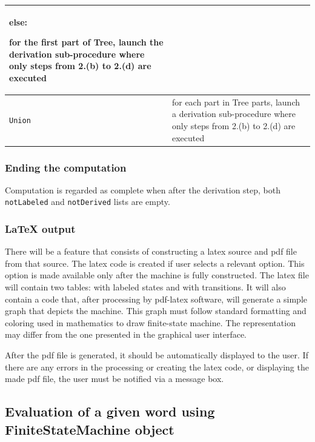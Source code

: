 \documentclass{article}
\begin{document}
\begin{tabularx}{\textwidth}{l|X}
\vspace{5pt}
\textbf{else}:

for the first part of Tree, launch the derivation sub-procedure where only steps from 2.(b) to 2.(d)
are executed \\ \hline

\verb|Union| &

for each part in Tree parts, launch a derivation sub-procedure where only steps from 2.(b) to 2.(d)
are executed \\

\end{tabularx}

\newpage

\subsubsection{Ending the computation}

Computation is regarded as complete when after the derivation step, both \verb|notLabeled| and
\verb|notDerived| lists are empty.

\subsubsection*{LaTeX output}

There will be a feature that consists of constructing a latex source and pdf file from that source.
The latex code is created if user selects a relevant option. This option is made available only
after the machine is fully constructed. The latex file will contain two tables: with labeled states
and with transitions. It will also contain a code that, after processing by pdf-latex software, will
generate a simple graph that depicts the machine. This graph must follow standard
formatting and coloring used in mathematics to draw finite-state machine. The representation may
differ from the one presented in the graphical user interface.

After the pdf file is generated, it should be automatically displayed to the user. If there are any
errors in the processing or creating the latex code, or displaying the made pdf file, the user must
be notified via a message box.


\subsection{Evaluation of a given word using FiniteStateMachine object}
\end{document}
